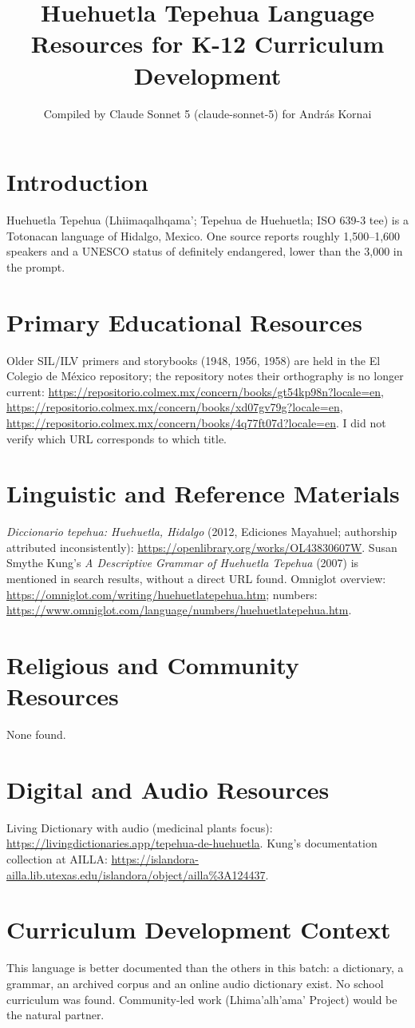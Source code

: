\documentclass[12pt]{article}
\title{Huehuetla Tepehua Language Resources for K-12 Curriculum Development}
\author{Compiled by Claude Sonnet 5 (claude-sonnet-5) for Andr\'as Kornai}
\date{}
\begin{document}
\maketitle
\section{Introduction}
Huehuetla Tepehua (Lhiimaqalhqama'; Tepehua de Huehuetla; ISO 639-3 tee) is a Totonacan language of Hidalgo, Mexico. One source reports roughly 1,500--1,600 speakers and a UNESCO status of definitely endangered, lower than the 3,000 in the prompt.
\section{Primary Educational Resources}
Older SIL/ILV primers and storybooks (1948, 1956, 1958) are held in the El Colegio de M\'exico repository; the repository notes their orthography is no longer current: \url{https://repositorio.colmex.mx/concern/books/gt54kp98n?locale=en}, \url{https://repositorio.colmex.mx/concern/books/xd07gv79g?locale=en}, \url{https://repositorio.colmex.mx/concern/books/4q77ft07d?locale=en}. I did not verify which URL corresponds to which title.
\section{Linguistic and Reference Materials}
\emph{Diccionario tepehua: Huehuetla, Hidalgo} (2012, Ediciones Mayahuel; authorship attributed inconsistently): \url{https://openlibrary.org/works/OL43830607W}. Susan Smythe Kung's \emph{A Descriptive Grammar of Huehuetla Tepehua} (2007) is mentioned in search results, without a direct URL found. Omniglot overview: \url{https://omniglot.com/writing/huehuetlatepehua.htm}; numbers: \url{https://www.omniglot.com/language/numbers/huehuetlatepehua.htm}.
\section{Religious and Community Resources}
None found.
\section{Digital and Audio Resources}
Living Dictionary with audio (medicinal plants focus): \url{https://livingdictionaries.app/tepehua-de-huehuetla}. Kung's documentation collection at AILLA: \url{https://islandora-ailla.lib.utexas.edu/islandora/object/ailla%3A124437}.
\section{Curriculum Development Context}
This language is better documented than the others in this batch: a dictionary, a grammar, an archived corpus and an online audio dictionary exist. No school curriculum was found. Community-led work (Lhima'alh'ama' Project) would be the natural partner.
\end{document}

